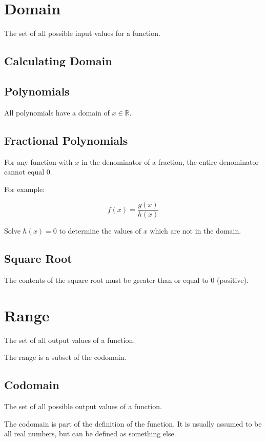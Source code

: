 \documentclass[a4paper,11pt]{article}
\begin{document}
\section{Domain}

The set of all possible input values for a function.


\subsection{Calculating Domain}

\subsection{Polynomials}

All polynomials have a domain of $x \in \mathbb{R}$.


\subsection{Fractional Polynomials}

For any function with $x$ in the denominator of a fraction, the entire
denominator cannot equal 0.

For example:

$$
f(x) = \frac{g(x)}{h(x)}
$$

Solve $h(x) = 0$ to determine the values of $x$ which are not in the domain.


\subsection{Square Root}

The contents of the square root must be greater than or equal to 0 (positive).



\section{Range}

The set of all output values of a function.

The range is a subset of the codomain.


\subsection{Codomain}

The set of all possible output values of a function.

The codomain is part of the definition of the function. It is usually assumed
to be all real numbers, but can be defined as something else.
\end{document}
